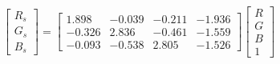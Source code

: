 \begin{equation}
\begin{bmatrix}
  R_s \\ G_s \\ B_s 
\end{bmatrix}=
\left[\begin{matrix}1.898 & -0.039 & -0.211 & -1.936\\ 
-0.326 & 2.836 & -0.461 & -1.559\\ 
-0.093 & -0.538 & 2.805 & -1.526\end{matrix}\right]
\begin{bmatrix}
  R \\ G \\ B \\ 1 
\end{bmatrix}
\end{equation}
